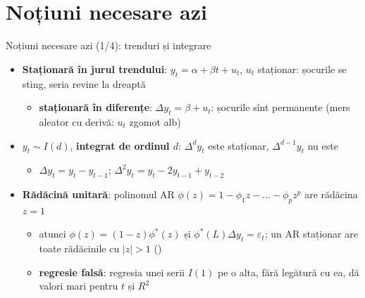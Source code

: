 \section{Noțiuni necesare azi}

\begin{frame}{Noțiuni necesare azi (1/4): trenduri și integrare}
\itemsize{\small}
\begin{itemize}
    \item \textbf{Staționară în jurul trendului}: $y_t = \alpha + \beta t + u_t$, $u_t$ staționar: șocurile se sting, seria revine la dreaptă
    \begin{itemize}
        \item \textbf{staționară în diferențe}: $\Delta y_t = \beta + u_t$: șocurile sînt permanente (mers aleator cu derivă: $u_t$ zgomot alb)
    \end{itemize}
    \item $y_t \sim I(d)$, \textbf{integrat de ordinul $d$}: $\Delta^d y_t$ este staționar, $\Delta^{d-1}y_t$ nu este
    \begin{itemize}
        \item $\Delta y_t = y_t - y_{t-1}$; $\Delta^2 y_t = y_t - 2y_{t-1} + y_{t-2}$
    \end{itemize}
    \item \textbf{Rădăcină unitară}: polinomul AR $\phi(z) = 1 - \phi_1 z - \dots - \phi_p z^p$ are rădăcina $z = 1$
    \begin{itemize}
        \item atunci $\phi(z) = (1 - z)\phi^*(z)$ și $\phi^*(L)\Delta y_t = \varepsilon_t$; un AR staționar are toate rădăcinile cu $|z| > 1$ ()
        \item \textbf{regresie falsă}: regresia unei serii $I(1)$ pe o alta, fără legătură cu ea, dă valori mari pentru $t$ și $R^2$
    \end{itemize}
\end{itemize}
\end{frame}

